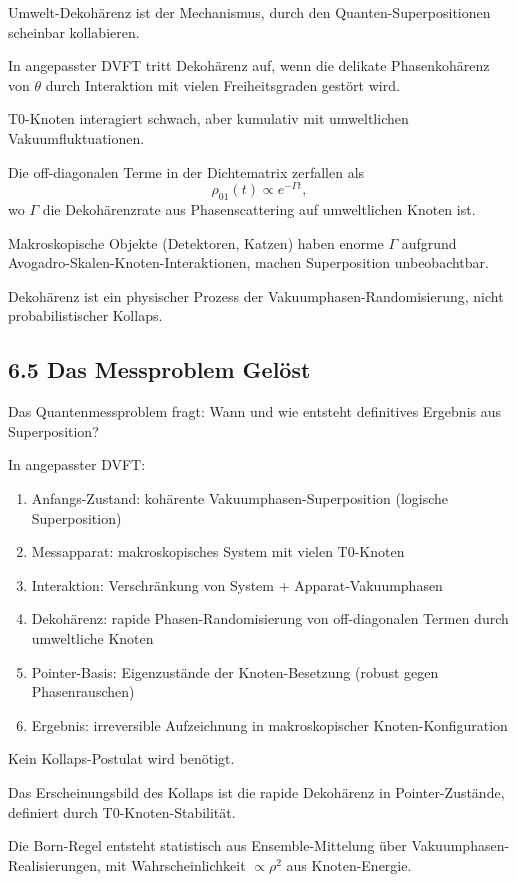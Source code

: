 \documentclass[12pt,a4paper]{article}
\begin{document}
	Umwelt-Dekohärenz ist der Mechanismus, durch den Quanten-Superpositionen scheinbar kollabieren.
	
	In angepasster DVFT tritt Dekohärenz auf, wenn die delikate Phasenkohärenz von $\theta$ durch Interaktion mit vielen Freiheitsgraden gestört wird.
	
	T0-Knoten interagiert schwach, aber kumulativ mit umweltlichen Vakuumfluktuationen.
	
	Die off-diagonalen Terme in der Dichtematrix zerfallen als
	\[
	\rho_{01}(t) \propto e^{-\Gamma t},
	\]
	wo $\Gamma$ die Dekohärenzrate aus Phasenscattering auf umweltlichen Knoten ist.
	
	Makroskopische Objekte (Detektoren, Katzen) haben enorme $\Gamma$ aufgrund Avogadro-Skalen-Knoten-Interaktionen, machen Superposition unbeobachtbar.
	
	Dekohärenz ist ein physischer Prozess der Vakuumphasen-Randomisierung, nicht probabilistischer Kollaps.
	
	\subsection{6.5 Das Messproblem Gelöst}
	
	Das Quantenmessproblem fragt: Wann und wie entsteht definitives Ergebnis aus Superposition?
	
	In angepasster DVFT:
	\begin{enumerate}
		\item Anfangs-Zustand: kohärente Vakuumphasen-Superposition (logische Superposition)
		\item Messapparat: makroskopisches System mit vielen T0-Knoten
		\item Interaktion: Verschränkung von System + Apparat-Vakuumphasen
		\item Dekohärenz: rapide Phasen-Randomisierung von off-diagonalen Termen durch umweltliche Knoten
		\item Pointer-Basis: Eigenzustände der Knoten-Besetzung (robust gegen Phasenrauschen)
		\item Ergebnis: irreversible Aufzeichnung in makroskopischer Knoten-Konfiguration
	\end{enumerate}
	
	Kein Kollaps-Postulat wird benötigt.
	
	Das Erscheinungsbild des Kollaps ist die rapide Dekohärenz in Pointer-Zustände, definiert durch T0-Knoten-Stabilität.
	
	Die Born-Regel entsteht statistisch aus Ensemble-Mittelung über Vakuumphasen-Realisierungen, mit Wahrscheinlichkeit $\propto \rho^2$ aus Knoten-Energie.
	
\end{document}
